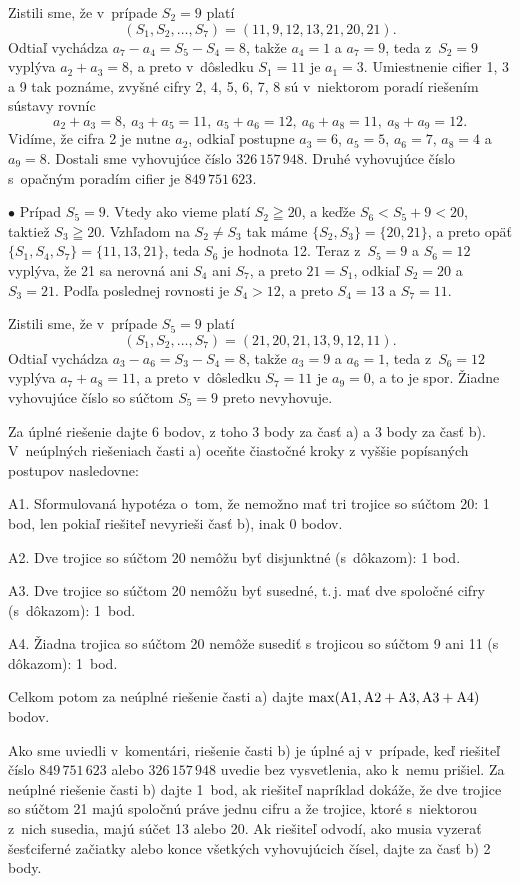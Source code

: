{Zistili sme, že v~prípade $S_2=9$ platí
$$
(S_1,S_2,\dots,S_7)=(11,9,12,13,21,20,21).
$$
Odtiaľ vychádza $a_7-a_4=S_{5}-S_4=8$, takže $a_4=1$ a $a_7=9$, teda
z~$S_2=9$ vyplýva $a_2+a_3=8$, a preto v~dôsledku $S_1=11$ je
$a_1=3$. Umiestnenie cifier 1, 3 a 9 tak poznáme, zvyšné cifry 2, 4,
5, 6, 7, 8 sú v~niektorom poradí riešením sústavy rovníc
$$
a_2+a_3=8,\ a_3+a_5=11,\ a_5+a_6=12,\ a_6+a_8=11,\
a_8+a_9=12.
$$
Vidíme, že cifra 2 je nutne $a_2$, odkiaľ postupne $a_3=6$,
$a_5=5$, $a_6=7$, $a_8=4$ a $a_9=8$. Dostali sme vyhovujúce číslo
$326\,157\,948$. Druhé vyhovujúce číslo s~opačným poradím cifier
je $849\,751\,623$.

\smallskip
$\bullet$ Prípad $S_5=9$. Vtedy ako vieme platí $S_2\geqq 20$,
a keďže $S_6<S_5+9<20$, taktiež $S_3\geqq20$. Vzhľadom na $S_2\ne
S_3$ tak máme $\{S_2,S_3\}=\{20,21\}$, a preto opäť
$\{S_1,S_4,S_7\}=\{11,13,21\}$, teda $S_6$ je  hodnota
12. Teraz z~$S_5=9$ a $S_6=12$ vyplýva, že 21 sa nerovná ani $S_4$
ani $S_7$, a preto $21=S_1$, odkiaľ $S_2=20$ a $S_3=21$.
Podľa poslednej rovnosti je $S_4>12$, a preto $S_4=13$ a $S_7=11$.

Zistili sme, že v~prípade $S_5=9$ platí
$$
(S_1,S_2,\dots,S_7)=(21,20,21,13,9,12,11).
$$
Odtiaľ vychádza $a_3-a_6=S_3-S_4=8$, takže $a_3=9$ a $a_6=1$, teda
z~$S_6=12$ vyplýva $a_7+a_8=11$, a preto v~dôsledku $S_7=11$ je
$a_9=0$, a to je spor. Žiadne vyhovujúce číslo so súčtom $S_5=9$
preto nevyhovuje.


\schemaABC
Za úplné riešenie dajte 6 bodov, z toho 3 body za časť a) a 3 body
za časť b).
\smallskip
\noindent V~neúplných riešeniach časti a) oceňte
čiastočné kroky z vyššie popísaných postupov nasledovne:
\item{A1.} Sformulovaná hypotéza o~tom, že nemožno mať tri trojice so súčtom 20: 1 bod, len pokiaľ riešiteľ nevyrieši časť b), inak 0 bodov.
\item{A2.} Dve trojice so súčtom 20 nemôžu byť disjunktné (s~dôkazom): 1 bod.
\item{A3.} Dve trojice so súčtom 20 nemôžu byť susedné, t.\,j. mať dve spoločné cifry (s~dôkazom): 1~bod.
\item{A4.} Žiadna trojica so súčtom 20 nemôže susediť s trojicou so súčtom 9 ani 11 (s dôkazom): 1~bod.

\noindent
Celkom potom za neúplné riešenie časti a) dajte $\rm\max(A1,A2+A3,A3+A4)$ bodov.

\smallskip
Ako sme uviedli v~komentári, riešenie časti b) je úplné aj v~prípade,
keď riešiteľ číslo $849\,751\,623$ alebo $326\,157\,948$
uvedie bez vysvetlenia, ako k~nemu prišiel. Za neúplné riešenie
časti b) dajte 1~bod, ak riešiteľ napríklad dokáže, že dve trojice so
súčtom 21 majú spoločnú práve jednu cifru a
že trojice, ktoré s~niektorou z~nich susedia, majú súčet 13 alebo 20.
Ak riešiteľ odvodí, ako musia vyzerať šesťciferné začiatky
alebo konce všetkých vyhovujúcich čísel, dajte za časť b) 2 body.
\endschema
}

